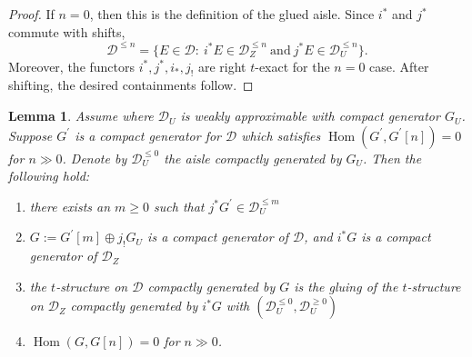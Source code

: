 \documentclass[11pt]{amsart}
\theoremstyle{plain}
\newtheorem{lemma}[theorem]{Lemma}
\theoremstyle{definition}
\numberwithin{equation}{section}
\numberwithin{theorem}{section}
\begin{document}
\begin{proof}
    If $n=0$, then this is the definition of the glued aisle.
    Since $i^\ast$ and $j^\ast$ commute with shifts, 
    \begin{displaymath}
        \mathcal{D}^{\leq n} = \{E\in \mathcal{D} :\ i^\ast E\in \mathcal{D}_Z^{\leq n}\ \text{and}\ j^\ast E\in \mathcal{D}_U^{\leq n}\}.
    \end{displaymath}
    Moreover, the functors $i^\ast, j^\ast, i_\ast, j_!$ are right $t$-exact for the $n=0$ case.
    After shifting, the desired containments follow.
\end{proof}

\begin{lemma}
    \label{lem:normalize}
    Assume  where $\mathcal{D}_U$ is weakly approximable with compact generator $G_U$.
    Suppose $G^\prime$ is a compact generator for $\mathcal{D}$ which satisfies $\operatorname{Hom}(G^\prime,G^\prime[n])=0$ for $n\gg 0$.
    Denote by $\mathcal{D}_U^{\leq 0}$ the aisle compactly generated by $G_U$.
    Then the following hold:
    \begin{enumerate}
        \item \label{lem:normalize1} there exists an $m\geq 0$ such that $j^\ast G^\prime \in \mathcal{D}_U^{\leq m}$
        \item \label{lem:normalize2} $G := G^\prime[m]\oplus j_! G_U$ is a compact generator of $\mathcal{D}$, and $i^\ast G$ is a compact generator of $\mathcal{D}_Z$
        \item \label{lem:normalize3} the $t$-structure on $\mathcal{D}$ compactly generated by $G$ is the gluing of the $t$-structure on $\mathcal{D}_Z$ compactly generated by $i^\ast G$ with $(\mathcal{D}_U^{\leq 0},\mathcal{D}_U^{\geq 0})$
        \item \label{lem:normalize4} $\operatorname{Hom}(G,G[n])=0$ for $n\gg 0$.
    \end{enumerate}
\end{lemma}
\end{document}
